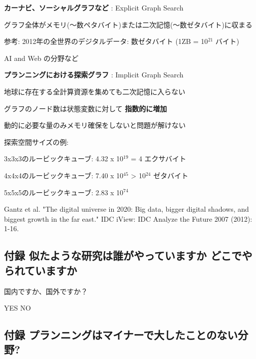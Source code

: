 \begin{container-fluid}
\begin{row-fluid}
\begin{span4}
\textbf{カーナビ、ソーシャルグラフなど} : Explicit Graph Search

グラフ全体がメモリ(〜数ペタバイト)または二次記憶(〜数ゼタバイト)に収まる

参考: 2012年の全世界のデジタルデータ: 数ゼタバイト (1ZB = 10$^{\text{21}}$ バイト)

AI and Web の分野など
\end{span4}
\begin{span8}
\textbf{プランニングにおける探索グラフ} : Implicit Graph Search

地球に存在する全計算資源を集めても二次記憶に入らない

グラフのノード数は状態変数に対して \textbf{指数的に増加}

動的に必要な量のみメモリ確保をしないと問題が解けない

探索空間サイズの例:

3x3x3のルービックキューブ: 4.32 x 10$^{\text{19}}$ = 4 エクサバイト

4x4x4のルービックキューブ: 7.40 x 10$^{\text{45}}$ > 10$^{\text{24}}$ ゼタバイト

5x5x5のルービックキューブ: 2.83 x 10$^{\text{74}}$
\end{span8}
\end{row-fluid}
\end{container-fluid}


\begin{note}
Gantz et al. "The digital universe in 2020: Big data, bigger digital shadows, and biggest growth in the far east." IDC iView: IDC Analyze the Future 2007 (2012): 1-16.
\end{note}

\subsection{付録 似たような研究は誰がやっていますか どこでやられていますか}
\label{sec-5-12}


\begin{xlarge}
国内ですか、国外ですか？
\begin{center}
YES NO
\end{center}
\end{xlarge}

\subsection{付録 プランニングはマイナーで大したことのない分野?}
\label{sec-5-13}


